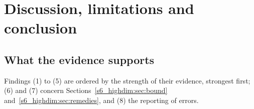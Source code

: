 \section{Discussion, limitations and conclusion}\label{s8_discussion:sec}

\subsection{What the evidence supports}\label{s8_discussion:sec:evidence}

Findings (1) to (5) are ordered by the strength of their evidence, strongest first; (6) and (7)
concern Sections~\ref{s6_highdim:sec:bound} and~\ref{s6_highdim:sec:remedies}, and (8) the
reporting of errors.

